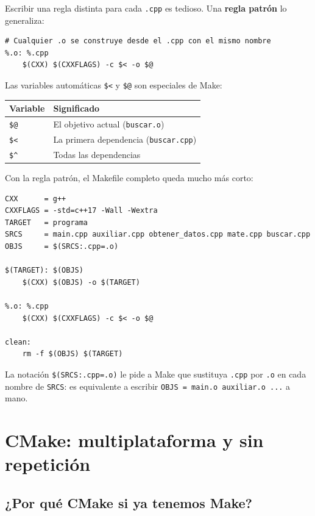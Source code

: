 \documentclass[12pt, oneside]{article}
\begin{document}
Escribir una regla distinta para cada \texttt{.cpp} es tedioso.  Una
\textbf{regla patrón} lo generaliza:

\begin{verbatim}
# Cualquier .o se construye desde el .cpp con el mismo nombre
%.o: %.cpp
	$(CXX) $(CXXFLAGS) -c $< -o $@
\end{verbatim}

Las variables automáticas \texttt{\$<} y \texttt{\$@} son especiales de Make:

\begin{center}
\begin{tabular}{ll}
  \toprule
  \textbf{Variable} & \textbf{Significado} \\
  \midrule
  \texttt{\$@} & El objetivo actual (\texttt{buscar.o}) \\
  \texttt{\$<} & La primera dependencia (\texttt{buscar.cpp}) \\
  \texttt{\$\^{}} & Todas las dependencias \\
  \bottomrule
\end{tabular}
\end{center}

Con la regla patrón, el Makefile completo queda mucho más corto:

\begin{verbatim}
CXX      = g++
CXXFLAGS = -std=c++17 -Wall -Wextra
TARGET   = programa
SRCS     = main.cpp auxiliar.cpp obtener_datos.cpp mate.cpp buscar.cpp
OBJS     = $(SRCS:.cpp=.o)

$(TARGET): $(OBJS)
	$(CXX) $(OBJS) -o $(TARGET)

%.o: %.cpp
	$(CXX) $(CXXFLAGS) -c $< -o $@

clean:
	rm -f $(OBJS) $(TARGET)
\end{verbatim}

La notación \texttt{\$(SRCS:.cpp=.o)} le pide a Make que sustituya
\texttt{.cpp} por \texttt{.o} en cada nombre de \texttt{SRCS}: es
equivalente a escribir \texttt{OBJS = main.o auxiliar.o ...} a mano.

\section{CMake: multiplataforma y sin repetición}

\subsection{¿Por qué CMake si ya tenemos Make?}
\end{document}
